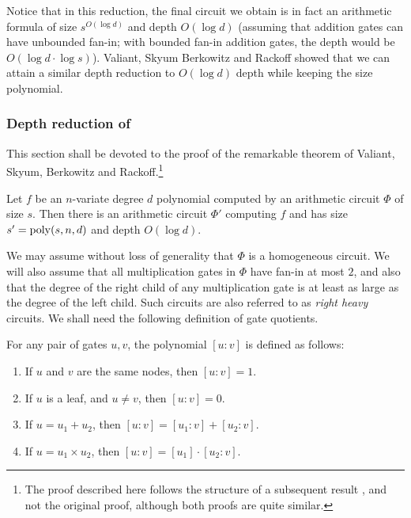 Notice that in this reduction, the final circuit we obtain is in fact an arithmetic formula of size $s^{O(\log d)}$ and depth $O(\log d)$ (assuming that addition gates can have unbounded fan-in; with bounded fan-in addition gates, the depth would be $O(\log d \cdot \log s)$). Valiant, Skyum Berkowitz and Rackoff \cite{vsbr83} showed that we can attain a similar depth reduction to $O(\log d)$ depth while keeping the size polynomial. 


\subsubsection{Depth reduction of \cite{vsbr83}}


This section shall be devoted to the proof of the remarkable theorem of Valiant, Skyum, Berkowitz and Rackoff.\footnote{The proof described here follows the structure of a subsequent result \cite{ajmv98}, and not the original proof, although both proofs are quite similar.}


\begin{theorem}\label{thm:vsbr}
  Let $f$ be an $n$-variate degree $d$ polynomial computed by an
  arithmetic circuit $\Phi$ of size $s$. Then there is an arithmetic
  circuit $\Phi'$ computing $f$ and has size $s' = \mathrm{poly}(s,n,d)$ and
  depth $O(\log d)$.
\end{theorem}

We may assume without loss of generality that $\Phi$ is a homogeneous circuit. We will also assume that all multiplication gates in $\Phi$ have fan-in at most $2$, and also that the degree of the right child of any multiplication gate is at least as large as the degree of the left child. Such circuits are also referred to as \emph{right heavy} circuits. We shall need the following definition of gate quotients.

\begin{definition}\label{defn:gate-quotient}
For any pair of gates $u,v$, the polynomial $[u:v]$ is defined as follows:
\begin{enumerate}
\item If $u$ and $v$ are the same nodes, then $[u:v] = 1$. 
\item If $u$ is a leaf, and $u\neq v$, then $[u:v] = 0$. 
\item If $u = u_1 + u_2$, then $[u:v] = [u_1:v] + [u_2:v]$.
\item If $u = u_1 \times u_2$, then $[u:v] = [u_1] \cdot [u_2 : v]$. 
\end{enumerate}
\end{definition}

